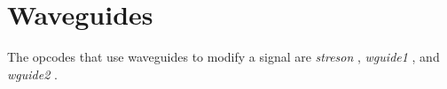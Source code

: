 \begin{comment}
\documentclass[10pt]{article}
\usepackage{fullpage, graphicx, url}
\setlength{\parskip}{1ex}
\setlength{\parindent}{0ex}
\title{Waveguides}



\begin{tabular}{ccc}
The Alternative Csound Reference Manual & & \\
Previous &Signal Modifiers &Next

\end{tabular}

\end{comment}
\section{Waveguides}


  The opcodes that use waveguides to modify a signal are \emph{streson}
, \emph{wguide1}
, and \emph{wguide2}
. 


\begin{comment}
\begin{tabular}{lcr}
Previous &Home &Next \\
Standard Filters &Up &Spectral Processing

\end{tabular}



\end{comment}
